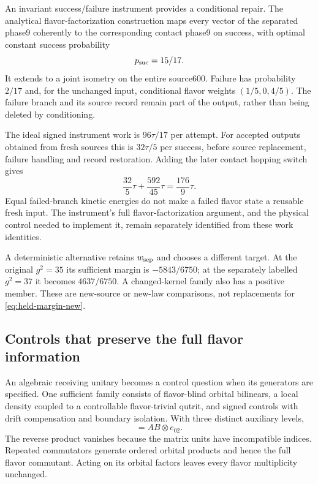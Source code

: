 An invariant success/failure instrument provides a conditional repair.
The analytical flavor-factorization construction maps every vector of the
separated phase9 coherently to the corresponding contact phase9 on success,
with optimal constant success probability
\begin{equation}
p_{\rm suc}=15/17.
\end{equation}
It extends to a joint isometry on the entire source600. Failure has
probability $2/17$ and, for the unchanged input, conditional flavor weights
$(1/5,0,4/5)$. The failure branch and its source record remain part of the
output, rather than being deleted by conditioning.

The ideal signed instrument work is $96\tau/17$ per attempt. For accepted
outputs obtained from fresh sources this is $32\tau/5$ per success,
before source replacement, failure handling and record restoration. Adding
the later contact hopping switch gives
\begin{equation}
\frac{32}{5}\tau+\frac{592}{45}\tau=\frac{176}{9}\tau.
\end{equation}
Equal failed-branch kinetic energies do not make a failed flavor state a
reusable fresh input. The instrument's full flavor-factorization argument,
and the physical control needed to implement it, remain separately
identified from these work identities.

A deterministic alternative retains $w_{\rm sep}$ and chooses a different
target. At the original $g^2=35$ its sufficient margin is
$-5843/6750$; at the separately labelled $g^2=37$ it becomes
$4637/6750$. A changed-kernel family also has a positive member. These are
new-source or new-law comparisons, not replacements for
\eqref{eq:held-margin-new}.

\subsection{Controls that preserve the full flavor information}

An algebraic receiving unitary becomes a control question when its
generators are specified. One sufficient family consists of flavor-blind
orbital bilinears, a local density coupled to a controllable flavor-trivial
qutrit, and signed controls with drift compensation and boundary isolation.
With three distinct auxiliary levels,
\begin{equation}
[A\otimes e_{01},B\otimes e_{12}]=AB\otimes e_{02}.
\end{equation}
The reverse product vanishes because the matrix units have incompatible
indices. Repeated commutators generate ordered orbital products and hence
the full flavor commutant. Acting on its orbital factors leaves every
flavor multiplicity unchanged.

